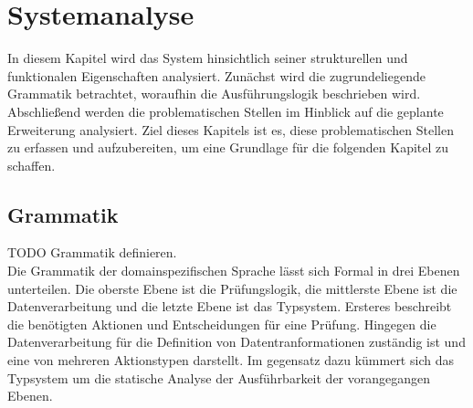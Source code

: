 \documentclass{article}
\begin{document}
    \section{Systemanalyse}
    In diesem Kapitel wird das System hinsichtlich seiner strukturellen und funktionalen Eigenschaften analysiert. 
    Zunächst wird die zugrundeliegende Grammatik betrachtet, woraufhin die Ausführungslogik beschrieben wird. Abschließend werden die problematischen Stellen im Hinblick auf die geplante Erweiterung analysiert.
    Ziel dieses Kapitels ist es, diese problematischen Stellen zu erfassen und aufzubereiten, um eine Grundlage für die folgenden Kapitel zu schaffen.\\
    \subsection{Grammatik}
    \label{Grammatik}
    TODO Grammatik definieren.\\
    Die Grammatik der domainspezifischen Sprache lässt sich Formal in drei Ebenen unterteilen. 
    Die oberste Ebene ist die Prüfungslogik, die mittlerste Ebene ist die Datenverarbeitung und die letzte Ebene ist das Typsystem. \cite{99}
    Ersteres beschreibt die benötigten Aktionen und Entscheidungen für eine Prüfung. \cite{99}
    Hingegen die Datenverarbeitung für die Definition von Datentranformationen zuständig ist und eine von mehreren Aktionstypen darstellt. \cite{99}
    Im gegensatz dazu kümmert sich das Typsystem um die statische Analyse der Ausführbarkeit der vorangegangen Ebenen. \cite{99}
\end{document}
